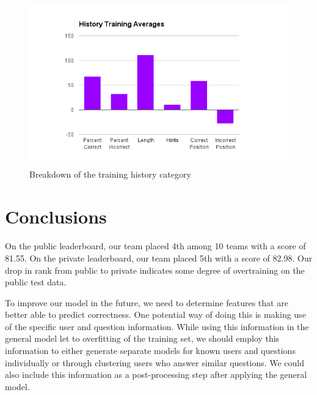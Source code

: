 \documentclass[letterpaper]{article}
\begin{document}
\begin{figure}[H]
\centering
\includegraphics[scale=0.5]{history.png}
\caption{Breakdown of the training history category}
\label{fig:mircoH}
\end{figure}




\section{Conclusions}

\paragraph{} On the public leaderboard, our team placed 4th among 10 teams with a score of 81.55. On the private leaderboard, our team placed 5th with a score of 82.98. Our drop in rank from public to private indicates some degree of overtraining on the public test data. 

To improve our model in the future, we need to determine features that are better able to predict correctness.  One potential way of doing this is making use of the specific user and question information.  While using this information in the general model let to overfitting of the training set, we should employ this information to either generate separate models for known users and questions individually or through clustering users who answer similar questions.  We could also include this information as a post-processing step after applying the general model.
\end{document}
